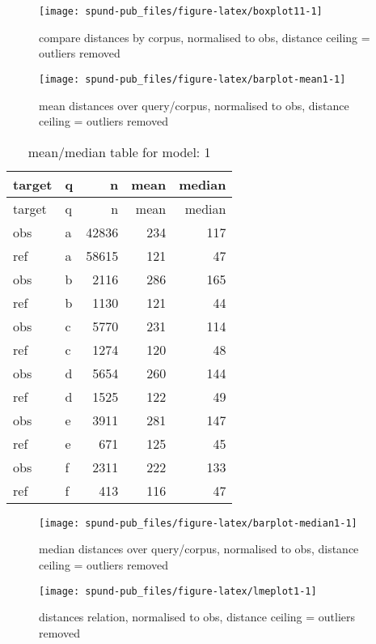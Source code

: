 \documentclass[
  12pt,
  oneside]{book}
\begin{document}
\begin{figure}[H]
\texttt{[image: spund-pub\_files/figure-latex/boxplot11-1]} \caption{compare distances by corpus, normalised to obs, distance ceiling =  outliers removed}\label{fig:boxplot11}
\end{figure}

\begin{figure}[H]
\texttt{[image: spund-pub\_files/figure-latex/barplot-mean1-1]} \caption{mean distances over query/corpus, normalised to obs, distance ceiling =  outliers removed}\label{fig:barplot-mean1}
\end{figure}

\begin{longtable}[]{@{}llrrr@{}}
\caption{\label{tab:dfe-table1}mean/median table for model: 1}\tabularnewline
\toprule\noalign{}
target & q & n & mean & median \\
\midrule\noalign{}
\endfirsthead
\toprule\noalign{}
target & q & n & mean & median \\
\midrule\noalign{}
\endhead
\bottomrule\noalign{}
\endlastfoot
obs & a & 42836 & 234 & 117 \\
ref & a & 58615 & 121 & 47 \\
obs & b & 2116 & 286 & 165 \\
ref & b & 1130 & 121 & 44 \\
obs & c & 5770 & 231 & 114 \\
ref & c & 1274 & 120 & 48 \\
obs & d & 5654 & 260 & 144 \\
ref & d & 1525 & 122 & 49 \\
obs & e & 3911 & 281 & 147 \\
ref & e & 671 & 125 & 45 \\
obs & f & 2311 & 222 & 133 \\
ref & f & 413 & 116 & 47 \\
\end{longtable}

\begin{figure}[H]
\texttt{[image: spund-pub\_files/figure-latex/barplot-median1-1]} \caption{median distances over query/corpus, normalised to obs, distance ceiling =  outliers removed}\label{fig:barplot-median1}
\end{figure}

\begin{figure}[H]
\texttt{[image: spund-pub\_files/figure-latex/lmeplot1-1]} \caption{distances relation, normalised to obs, distance ceiling =  outliers removed}\label{fig:lmeplot1}
\end{figure}
\end{document}
